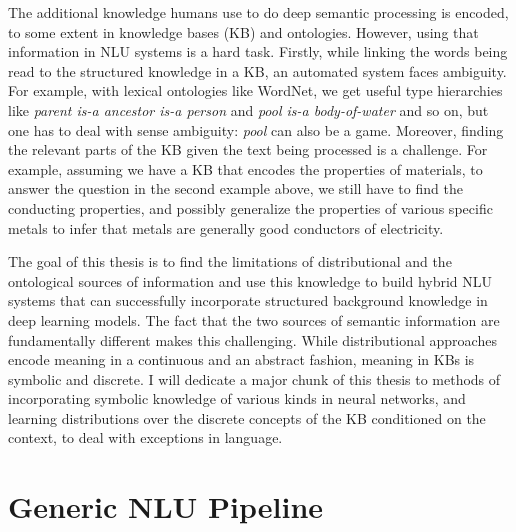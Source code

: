 The additional knowledge humans use to do deep semantic processing is encoded, to
some extent in knowledge bases (KB) and ontologies. However, using that information in NLU systems is a 
hard task. Firstly, while linking the words being read to the structured knowledge
in a KB, an automated system faces ambiguity. For example, with lexical ontologies like WordNet, 
we get useful type hierarchies like \textit{parent is-a ancestor is-a person} and \textit{pool is-a body-of-water} 
and so on, but one has to deal with sense ambiguity: \textit{pool} can also be a game. Moreover, finding the 
relevant parts of the KB given the text being processed is a challenge. For example, assuming we have a KB that encodes
the properties of materials, to answer the question in the second example above, we still have to 
find the conducting properties, and possibly generalize the properties of various specific metals to
infer that metals are generally good conductors of electricity.


The goal of this thesis is to find the limitations of distributional and the ontological 
sources of information and use this knowledge to build hybrid NLU systems that can successfully 
incorporate structured background knowledge in deep learning models. The fact
that the two sources of semantic information are fundamentally different 
makes this challenging. While distributional approaches encode meaning in a
continuous and an abstract fashion, meaning in KBs is symbolic and discrete. 
I will dedicate a major chunk of this thesis to methods of incorporating
symbolic knowledge of various kinds in neural networks, and learning 
distributions over the discrete concepts of the KB conditioned on the context,
to deal with exceptions in language.

\section{Generic NLU Pipeline}


